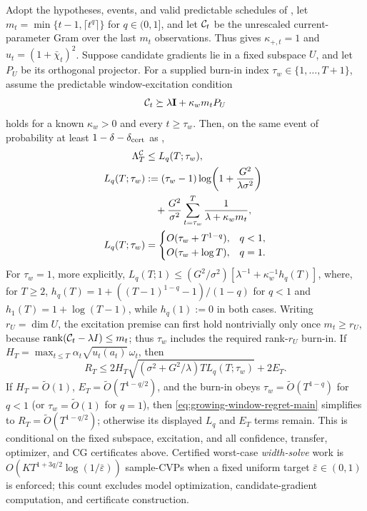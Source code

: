 \begin{theorem}\label{thm:growing-window}
Adopt the hypotheses, events, and valid predictable schedules of
, let $m_t=\min\{t-1,\lceil t^q\rceil\}$ for $q\in(0,1]$,
and let $\mathcal{C}_t$ be the unrescaled current-parameter Gram over the last $m_t$
observations.  Thus  gives $\kappa_{+,t}=1$ and
$u_t=(1+\bar\chi_t)^2$.  Suppose candidate gradients lie in a fixed subspace
$U$, and let $P_U$ be its orthogonal projector.  For a supplied burn-in index
$\tau_w\in\{1,\ldots,T+1\}$, assume the
predictable window-excitation condition
\[
 \mathcal{C}_t\succeq\lambda\mathbf{I}+\kappa_wm_tP_U
\]
holds for a known $\kappa_w>0$ and every $t\ge\tau_w$.  Then, on the same
event of probability at least $1-\delta-\delta_{\rm cert}$ as
,
\begin{equation}\label{eq:growing-window-lambda-main}
\begin{aligned}
 \Lambda^{\mathcal{C}}_T&\le L_q(T;\tau_w),\\
 L_q(T;\tau_w)&:=(\tau_w-1)\log\!\left(1+
 \frac{G^2}{\lambda\sigma^2}\right)\\
 &\quad+\frac{G^2}{\sigma^2}\sum_{t=\tau_w}^T
 \frac1{\lambda+\kappa_wm_t},\\
 L_q(T;\tau_w)&=\begin{cases}O(\tau_w+T^{1-q}),&q<1,\\
 O(\tau_w+\log T),&q=1.
 \end{cases}
\end{aligned}
\end{equation}
For $\tau_w=1$, more explicitly,
$L_q(T;1)\le(G^2/\sigma^2)[\lambda^{-1}+\kappa_w^{-1}h_q(T)]$,
where, for $T\ge2$, $h_q(T)=1+((T-1)^{1-q}-1)/(1-q)$ for $q<1$ and
$h_1(T)=1+\log(T-1)$, while $h_q(1):=0$ in both cases.
Writing $r_U=\dim U$, the excitation premise can first hold nontrivially only
once $m_t\ge r_U$, because $\operatorname{rank}(\mathcal{C}_t-\lambda I)\le m_t$;
thus $\tau_w$ includes the required rank-$r_U$ burn-in.
If $H_T=\max_{t\le T}\alpha_t\sqrt{u_t(a_t)}\,\omega_t$, then
\begin{equation}\label{eq:growing-window-regret-main}
 R_T\le2H_T\sqrt{(\sigma^2+G^2/\lambda)T L_q(T;\tau_w)}+2E_T.
\end{equation}
If $H_T=\widetilde O(1)$, $E_T=\widetilde O(T^{1-q/2})$, and the burn-in
obeys $\tau_w=\widetilde O(T^{1-q})$ for $q<1$ (or
$\tau_w=\widetilde O(1)$ for $q=1$), then
\eqref{eq:growing-window-regret-main} simplifies to
$R_T=\widetilde O(T^{1-q/2})$; otherwise its displayed $L_q$ and $E_T$ terms
remain.  This is conditional on the fixed subspace, excitation, and all
confidence, transfer, optimizer, and CG certificates above.
Certified worst-case \emph{width-solve} work is
$O(KT^{1+3q/2}\log(1/\bar\varepsilon))$ sample-CVPs when a fixed uniform
target $\bar\varepsilon\in(0,1)$ is enforced; this count excludes model
optimization, candidate-gradient computation, and certificate construction.
\end{theorem}
